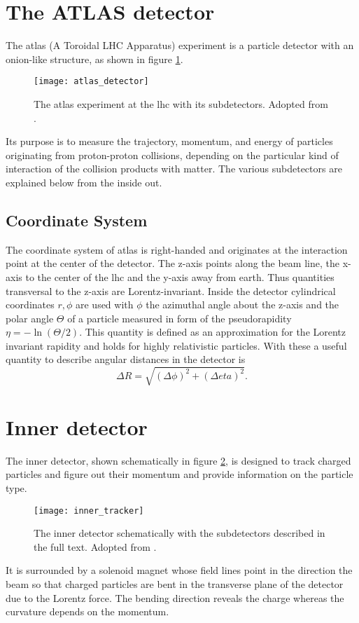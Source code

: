 \section{The ATLAS detector}
The \ac{atlas} (A Toroidal LHC Apparatus) experiment is a particle detector with an onion-like structure, as shown in figure \ref{fig:atlas_detector}.
\begin{figure}
    \centering
    \texttt{[image: atlas\_detector]}
        \caption[]{The \ac{atlas} experiment at the \ac{lhc} with its subdetectors. Adopted from \citep{Pequenao:1095924}.}
    \label{fig:atlas_detector}    
\end{figure}
Its purpose is to measure the trajectory, momentum, and energy of particles originating from proton-proton collisions, depending on the particular kind of interaction of the collision products with matter. The various subdetectors are explained below from the inside out.

\subsection*{Coordinate System}
The coordinate system of \ac{atlas} is right-handed and originates at the interaction point at the center of the detector. The z-axis points along the beam line, the x-axis to the center of the lhc and the y-axis away from earth. Thus quantities transversal to the z-axis are Lorentz-invariant. Inside the detector cylindrical coordinates $r,\phi$ are used with $\phi$ the azimuthal angle about the z-axis and the polar angle $\Theta$ of a particle measured in form of the pseudorapidity $\eta=-\ln(\Theta/2)$. This quantity is defined as an approximation for the Lorentz invariant rapidity and holds for highly relativistic particles. With these a useful quantity to describe angular distances in the detector is
\begin{equation}
    \Delta R = \sqrt{(\Delta\phi)^2+(\Delta eta)^2}.
\end{equation}

\section{Inner detector}
The inner detector, shown schematically in figure \ref{fig:inner_tracker}, is designed to track charged particles and figure out their momentum and provide information on the particle type. 
\begin{figure}
    \centering
    \texttt{[image: inner\_tracker]}
        \caption[]{The inner detector schematically with the subdetectors described in the full text. Adopted from \citep{Potamianos:2016ptf}.}
    \label{fig:inner_tracker}    
\end{figure}
It is surrounded by a solenoid magnet whose field lines point in the direction the beam so that charged particles are bent in the transverse plane of the detector due to the Lorentz force. The bending direction reveals the charge whereas the curvature depends on the momentum.

